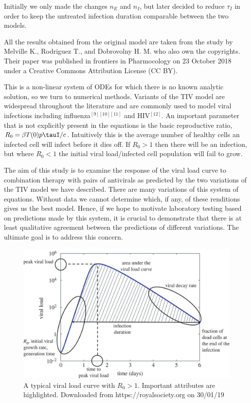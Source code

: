 \documentclass[a4paper,11pt]{article}
\begin{document}
Initially we only made the changes $n_E$ and $n_I$, but later decided to reduce $\tau_I$ in order to keep the untreated infection duration comparable between the two models. 

All the results obtained from the original model are taken from the study by Melville K., Rodriguez T., and Dobrovolny H. M. who also own the copyrights. Their paper was published in frontiers in Pharmocology on 23 October 2018 under a Creative Commons Attribution License (CC BY). 

This is a non-linear system of ODEs for which there is no known analytic solution, so we turn to numerical methods. Variants of the TIV model are widespread throughout the literature and are commonly used to model viral infections including influenza$^{[9][10][11]}$ and HIV$^{[12]}$. An important parameter that is not explicitly present in the equations is the basic reproductive ratio, $R_0 = \beta T(0)p\tauI/c$. Intuitively this is the average number of healthy cells an infected cell will infect before it dies off. If $R_0 > 1$ then there will be an infection, but where $R_0 < 1$ the initial viral load/infected cell population will fail to grow.

The aim of this study is to examine the response of the viral load curve to combination therapy with pairs of antivirals as predicted by the two variations of the TIV model we have described. There are many variations of this system of equations. Without data we cannot determine which, if any, of these renditions gives us the best model. Hence, if we hope to motivate laboratory testing based on predictions made by this system, it is crucial to demonstrate that there is at least qualitative agreement between the predictions of different variations. The ultimate goal is to address this concern. 

\begin{figure}
    \centering
    \includegraphics[scale = 1.1]{viralcurve.jpg}
    \caption{\small A typical viral load curve with $R_0 > 1$. Important attributes are highlighted. Downloaded from https://royalsociety.org on 30/01/19
}
    \label{fig:my_label}
\end{figure}
\end{document}
